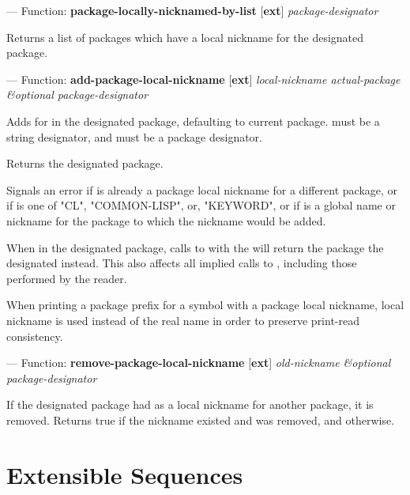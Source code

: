 \documentclass[10pt]{book}
\begin{document}
--- Function: \textbf{package-locally-nicknamed-by-list} [\textbf{ext}] \textit{package-designator}

\begin{adjustwidth}{5em}{5em}
Returns a list of packages which have a local nickname for the
designated package.
\end{adjustwidth}

--- Function: \textbf{add-package-local-nickname} [\textbf{ext}] \textit{local-nickname actual-package \&optional package-designator}

\begin{adjustwidth}{5em}{5em}
  Adds  for  in the designated
  package, defaulting to current package.  must be
  a string designator, and  must be a package
  designator.

  Returns the designated package.

  Signals an error if  is already a package local
  nickname for a different package, or if  is one
  of "CL", "COMMON-LISP", or, "KEYWORD", or if  is
  a global name or nickname for the package to which the nickname would
  be added.

  When in the designated package, calls to  with the
   will return the package the designated
   instead. This also affects all implied calls to
  , including those performed by the reader.

  When printing a package prefix for a symbol with a package local
  nickname, local nickname is used instead of the real name in order to
  preserve print-read consistency.
\end{adjustwidth}

--- Function: \textbf{remove-package-local-nickname} [\textbf{ext}] \textit{old-nickname \&optional package-designator}

\begin{adjustwidth}{5em}{5em}
  If the designated package had  as a local nickname
  for another package, it is removed. Returns true if the nickname
  existed and was removed, and  otherwise.
\end{adjustwidth}


         
\section{Extensible Sequences}
\end{document}
